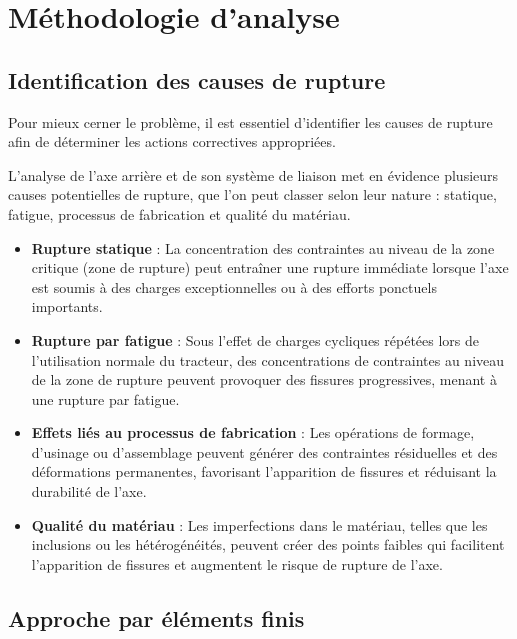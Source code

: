 \documentclass{rapportECL}
\begin{document}
\section{Méthodologie d'analyse}

\subsection{Identification des causes de rupture}
Pour mieux cerner le problème, il est essentiel d’identifier les causes de rupture afin de déterminer les actions correctives appropriées.  

L’analyse de l’axe arrière et de son système de liaison met en évidence plusieurs causes potentielles de rupture, que l’on peut classer selon leur nature : statique, fatigue, processus de fabrication et qualité du matériau.


\begin{itemize}
    \item \textbf{Rupture statique} : 
    La concentration des contraintes au niveau de la zone critique (zone de rupture) peut entraîner une rupture immédiate lorsque l’axe est soumis à des charges exceptionnelles ou à des efforts ponctuels importants.  

    \item \textbf{Rupture par fatigue} : 
    Sous l’effet de charges cycliques répétées lors de l’utilisation normale du tracteur, des concentrations de contraintes au niveau de la zone de rupture peuvent provoquer des fissures progressives, menant à une rupture par fatigue.  
    \item \textbf{Effets liés au processus de fabrication} : 
    Les opérations de formage, d’usinage ou d’assemblage peuvent générer des contraintes résiduelles et des déformations permanentes, favorisant l’apparition de fissures et réduisant la durabilité de l’axe.

    \item \textbf{Qualité du matériau} : 
    Les imperfections dans le matériau, telles que les inclusions ou les hétérogénéités, peuvent créer des points faibles qui facilitent l’apparition de fissures et augmentent le risque de rupture de l’axe.

\end{itemize}


\subsection{Approche par éléments finis}
 
\end{document}
